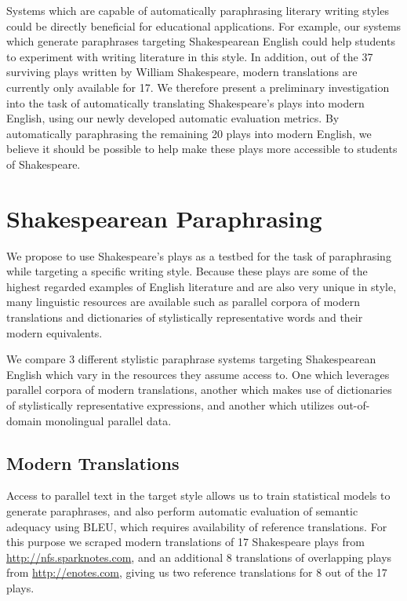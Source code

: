 \documentclass[10pt,a5paper,twoside]{article}
\begin{document}
Systems which are capable of automatically paraphrasing literary writing styles could be directly beneficial for educational applications.  For example, our systems which generate paraphrases targeting
Shakespearean English could help students to experiment with writing literature in this style.
In addition, out of the 37 surviving plays written by William Shakespeare, modern translations are currently only available for 17.  
We therefore present a preliminary investigation into the task of automatically translating Shakespeare's plays into modern English, using our newly developed
automatic evaluation metrics.  By automatically paraphrasing the remaining 20 plays into modern English, 
we believe it should be possible to help make these plays more accessible to students of Shakespeare.

\section{Shakespearean Paraphrasing}
We propose to use Shakespeare's plays as a testbed for the task of paraphrasing while targeting a specific writing style.  Because these plays are some of the
highest regarded examples of English literature and are also very unique in style, many linguistic resources are available such as parallel corpora
of modern translations and dictionaries of stylistically representative words and their modern equivalents.

We compare 3 different stylistic paraphrase systems targeting Shakespearean English which vary in the resources they assume access to.
One which leverages parallel corpora of modern translations, another which makes use
of dictionaries of stylistically representative expressions, and another which utilizes out-of-domain monolingual parallel data.

\subsection{Modern Translations}
Access to parallel text in the target style allows us to train statistical models to generate paraphrases, and also perform automatic evaluation of semantic adequacy using BLEU, which requires availability of reference translations.  For this purpose we scraped modern translations of 17 Shakespeare plays from \url{http://nfs.sparknotes.com}, and an additional 8 translations of overlapping plays from \url{http://enotes.com}, giving us two reference translations for 8 out of the 17 plays.
\end{document}
